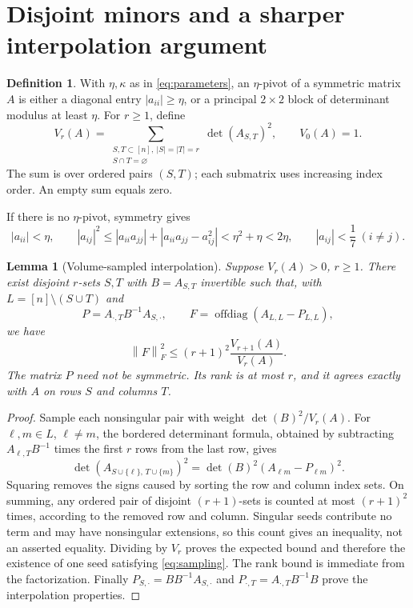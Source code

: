 \documentclass[11pt]{article}
\numberwithin{equation}{section}
\newtheorem{lemma}[theorem]{Lemma}
\theoremstyle{definition}\newtheorem{definition}[theorem]{Definition}
\theoremstyle{remark}\newtheorem{remark}[theorem]{Remark}
\newcommand{\1}{\mathbf 1}\newcommand{\diag}{\operatorname{diag}}
\newcommand{\off}{\operatorname{offdiag}}\newcommand{\supp}{\operatorname{supp}}
\newcommand{\norm}[1]{\left\lVert#1\right\rVert}\newcommand{\abs}[1]{\left|#1\right|}
\begin{document}
\section{Disjoint minors and a sharper interpolation argument}\label{sec:skeleton}
\begin{definition}\label{def:pivot-volume}
With $\eta,\kappa$ as in \eqref{eq:parameters}, an $\eta$-pivot of a symmetric matrix $A$ is either a diagonal entry $|a_{ii}|\ge\eta$, or a principal $2\times2$ block of determinant modulus at least $\eta$. For $r\ge1$, define
\begin{equation}\label{eq:Vr}
 V_r(A)=\sum_{\substack{S,T\subset[n],\ |S|=|T|=r\\S\cap T=\varnothing}}\det(A_{S,T})^2,
 \qquad V_0(A)=1.
\end{equation}
The sum is over ordered pairs $(S,T)$; each submatrix uses increasing index order. An empty sum equals zero.
\end{definition}

If there is no $\eta$-pivot, symmetry gives
\begin{equation}\label{eq:small-entry}
 |a_{ii}|<\eta,\qquad
 |a_{ij}|^2\le |a_{ii}a_{jj}|+|a_{ii}a_{jj}-a_{ij}^2|
 <\eta^2+\eta<2\eta,
 \qquad |a_{ij}|<\frac17\ (i\ne j).
\end{equation}

\begin{lemma}[Volume-sampled interpolation]\label{lem:sampling}
Suppose $V_r(A)>0$, $r\ge1$. There exist disjoint $r$-sets $S,T$ with $B=A_{S,T}$ invertible such that, with $L=[n]\setminus(S\cup T)$ and
\begin{equation}\label{eq:P}
 P=A_{\cdot,T}B^{-1}A_{S,\cdot},\qquad
 F=\off(A_{L,L}-P_{L,L}),
\end{equation}
we have
\begin{equation}\label{eq:sampling}
 \norm F_F^2\le(r+1)^2\frac{V_{r+1}(A)}{V_r(A)}.
\end{equation}
The matrix $P$ need not be symmetric. Its rank is at most $r$, and it agrees exactly with $A$ on rows $S$ and columns $T$.
\end{lemma}
\begin{proof}
Sample each nonsingular pair with weight $\det(B)^2/V_r(A)$. For $\ell,m\in L$, $\ell\ne m$, the bordered determinant formula, obtained by subtracting $A_{\ell,T}B^{-1}$ times the first $r$ rows from the last row, gives
\[
 \det(A_{S\cup\{\ell\},\,T\cup\{m\}})^2
 =\det(B)^2(A_{\ell m}-P_{\ell m})^2.
\]
Squaring removes the signs caused by sorting the row and column index sets. On summing, any ordered pair of disjoint $(r+1)$-sets is counted at most $(r+1)^2$ times, according to the removed row and column. Singular seeds contribute no term and may have nonsingular extensions, so this count gives an inequality, not an asserted equality. Dividing by $V_r$ proves the expected bound and therefore the existence of one seed satisfying \eqref{eq:sampling}. The rank bound is immediate from the factorization. Finally $P_{S,\cdot}=BB^{-1}A_{S,\cdot}$ and $P_{\cdot,T}=A_{\cdot,T}B^{-1}B$ prove the interpolation properties.
\end{proof}
\end{document}
